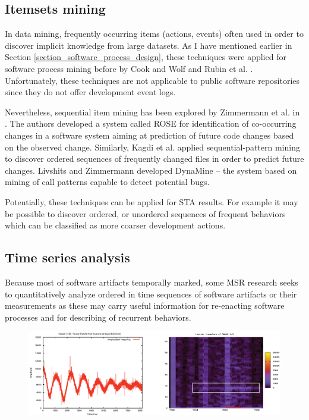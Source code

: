\subsection{Itemsets mining}
In data mining, frequently occurring items (actions, events) often used in order to discover implicit knowledge from
large datasets. As I have mentioned earlier in Section \ref{section_software_process_design}, these techniques were 
applied for software process mining before by Cook and Wolf \cite{citeulike:328044} \cite{citeulike:5120757} 
\cite{citeulike:5128143} and Rubin et al. \cite{citeulike:1885717}. Unfortunately, these techniques are not applicable
to public software repositories since they do not offer development event logs.

Nevertheless, sequential item mining has been explored by Zimmermann et al. in \cite{citeulike:277045}. 
The authors developed a system called ROSE for identification of co-occurring changes in a software system aiming at 
prediction of future code changes based on the observed change. 
Similarly, Kagdi et al. \cite{citeulike:3929070} applied sequential-pattern mining to discover ordered sequences of 
frequently changed files in order to predict future changes. 
Livshits and Zimmermann \cite{citeulike:393158} developed DynaMine -- the system based on mining of call patterns 
capable to detect potential bugs.

Potentially, these techniques can be applied for STA results. For example it may be possible to discover ordered, or
unordered sequences of frequent behaviors which can be classified as more coarser development actions.

\subsection{Time series analysis}\label{chapter2_section-tsanalysis}
Because most of software artifacts temporally marked, some MSR research seeks to quantitatively analyze ordered 
in time sequences of software artifacts or their measurements as these may carry useful information for re-enacting 
software processes and for describing of recurrent behaviors. 

\begin{figure}[t!]
   \centering
   \includegraphics[width=145mm]{figures/FourrierMySQL.eps}
   \caption{}
   \label{fig:mysql-fourrier}
\end{figure}

